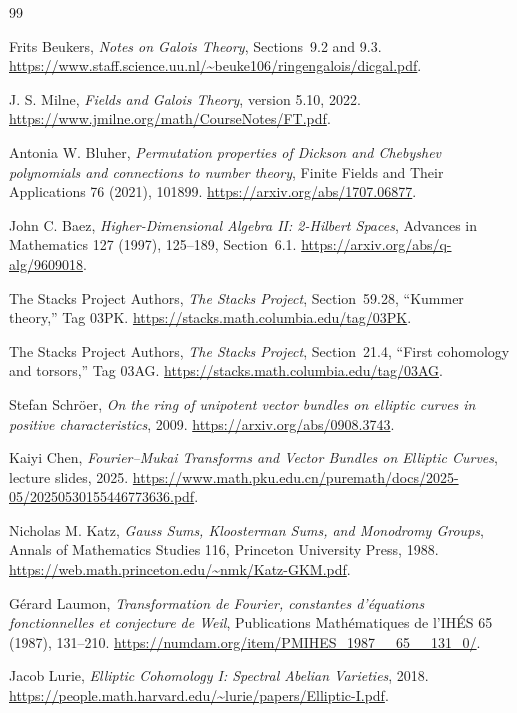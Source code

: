 \documentclass[11pt]{article}
\theoremstyle{remark}
\begin{document}
\begin{thebibliography}{99}
\small\raggedright
{}
Frits Beukers, \emph{Notes on Galois Theory}, Sections~9.2 and 9.3.
\url{https://www.staff.science.uu.nl/~beuke106/ringengalois/dicgal.pdf}.

J. S. Milne, \emph{Fields and Galois Theory}, version 5.10, 2022.
\url{https://www.jmilne.org/math/CourseNotes/FT.pdf}.

Antonia W. Bluher, \emph{Permutation properties of Dickson and Chebyshev polynomials and connections to number theory}, Finite Fields and Their Applications 76 (2021), 101899.
\url{https://arxiv.org/abs/1707.06877}.

John C. Baez, \emph{Higher-Dimensional Algebra II: 2-Hilbert Spaces}, Advances in Mathematics 127 (1997), 125--189, Section~6.1.
\url{https://arxiv.org/abs/q-alg/9609018}.

The Stacks Project Authors, \emph{The Stacks Project}, Section~59.28, ``Kummer theory,'' Tag 03PK.
\url{https://stacks.math.columbia.edu/tag/03PK}.

The Stacks Project Authors, \emph{The Stacks Project}, Section~21.4, ``First cohomology and torsors,'' Tag 03AG.
\url{https://stacks.math.columbia.edu/tag/03AG}.

Stefan Schr\"oer, \emph{On the ring of unipotent vector bundles on elliptic curves in positive characteristics}, 2009.
\url{https://arxiv.org/abs/0908.3743}.

Kaiyi Chen, \emph{Fourier--Mukai Transforms and Vector Bundles on Elliptic Curves}, lecture slides, 2025.
\url{https://www.math.pku.edu.cn/puremath/docs/2025-05/20250530155446773636.pdf}.

Nicholas M. Katz, \emph{Gauss Sums, Kloosterman Sums, and Monodromy Groups}, Annals of Mathematics Studies 116, Princeton University Press, 1988.
\url{https://web.math.princeton.edu/~nmk/Katz-GKM.pdf}.

G\'erard Laumon, \emph{Transformation de Fourier, constantes d'\'equations fonctionnelles et conjecture de Weil}, Publications Math\'ematiques de l'IH\'ES 65 (1987), 131--210.
\url{https://numdam.org/item/PMIHES_1987__65__131_0/}.

Jacob Lurie, \emph{Elliptic Cohomology I: Spectral Abelian Varieties}, 2018.
\url{https://people.math.harvard.edu/~lurie/papers/Elliptic-I.pdf}.


\end{thebibliography}
\end{document}

